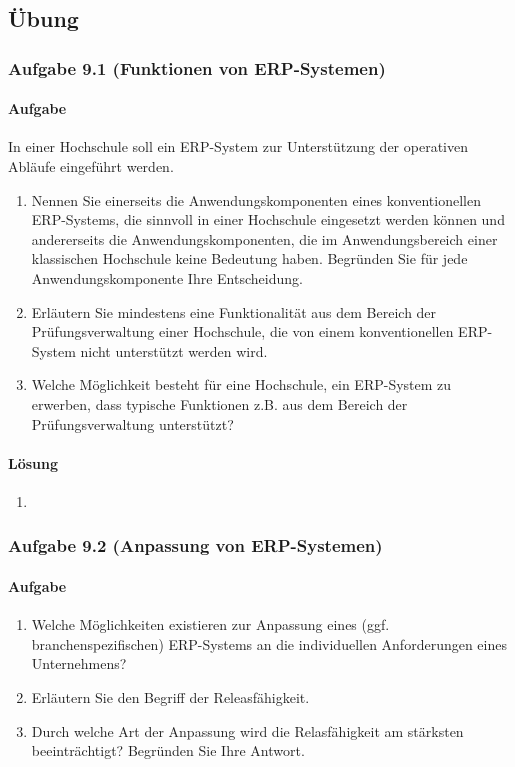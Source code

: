 \subsection{Übung}

\subsubsection*{Aufgabe 9.1 (Funktionen von ERP-Systemen)}
    \paragraph*{Aufgabe}
        In einer Hochschule soll ein ERP-System zur Unterstützung der operativen Abläufe eingeführt
        werden.
        \begin{enumerate}[label=\alph*)]
            \item Nennen Sie einerseits die Anwendungskomponenten eines konventionellen ERP-Systems, die sinnvoll in einer Hochschule eingesetzt werden können und andererseits
            die Anwendungskomponenten, die im Anwendungsbereich einer klassischen Hochschule keine Bedeutung haben. Begründen Sie für jede Anwendungskomponente Ihre Entscheidung.
            \item Erläutern Sie mindestens eine Funktionalität aus dem Bereich der Prüfungsverwaltung einer Hochschule, die von einem konventionellen ERP-System nicht unterstützt
            werden wird.
            \item Welche Möglichkeit besteht für eine Hochschule, ein ERP-System zu erwerben, dass typische Funktionen z.B. aus dem Bereich der Prüfungsverwaltung unterstützt?
        \end{enumerate}
    \paragraph*{Lösung}
        \begin{enumerate}[label=\alph*)]
            \item
        \end{enumerate}

\subsubsection*{Aufgabe 9.2 (Anpassung von ERP-Systemen)}
    \paragraph*{Aufgabe}
        \begin{enumerate}[label=\alph*)]
            \item Welche Möglichkeiten existieren zur Anpassung eines (ggf. branchenspezifischen) ERP-Systems an die individuellen Anforderungen eines Unternehmens?
            \item Erläutern Sie den Begriff der Releasfähigkeit.
            \item Durch welche Art der Anpassung wird die Relasfähigkeit am stärksten beeinträchtigt? Begründen Sie Ihre Antwort.
        \end{enumerate}       
